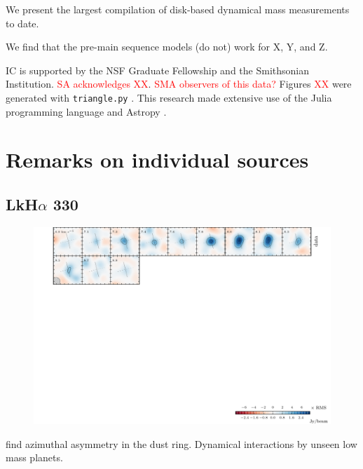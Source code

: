 \documentclass[twocolumn]{aastex6}
\newcommand{\todo}[1]{ \textcolor{red}{#1}}
\begin{document}
We present the largest compilation of disk-based dynamical mass measurements to date.

We find that the pre-main sequence models (do not) work for X, Y, and Z.

\acknowledgments
IC is supported by the NSF Graduate Fellowship and the Smithsonian Institution. \todo{SA acknowledges XX}. \todo{SMA observers of this data?}  Figures \todo{XX} were generated with \texttt{triangle.py} \citep{foreman-mackey14}. This research made extensive use of the Julia programming language \citep{julia12} and Astropy \citep{astropy13}.




\appendix

\section{Remarks on individual sources}

\subsection{LkH$\alpha$ 330}
\begin{figure}[htb]
\begin{center}
  \includegraphics[draft]{LkHa330.pdf}
  \end{center}
\end{figure}

\citet{isella13} find azimuthal asymmetry in the dust ring. Dynamical interactions by unseen low mass planets.
\end{document}
